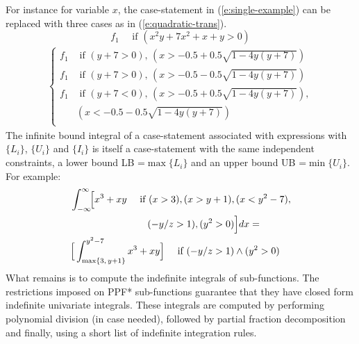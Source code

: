 \documentclass{article}
\newcommand{\case}[2]{#2 &\text{ if } #1}%
\newcommand{\singlecase}[2]{#2 \quad \text{ if } #1}
\begin{document}
For instance for variable $x$, the case-statement in (\ref{e:single-example})
can be replaced with three cases as in (\ref{e:quadratic-trans}).
{
\footnotesize
\begin{equation}
\label{e:single-example}
\singlecase{(x^2 y + 7x^2 + x + y > 0)}{f_1}
\end{equation}
\begin{align}
\label{e:quadratic-trans}
{
\begin{cases}
  \case{(y+7>0), \, (x> -0.5 + 0.5\sqrt{1 - 4y(y+7)}) }{f_1} \\ 
  \case{(y+7>0), \, (x> -0.5 - 0.5\sqrt{1 - 4y(y+7)}) }{f_1} \\ 
  \case{(y+7<0), \, (x > -0.5 + 0.5\sqrt{1 - 4y(y+7)}),\\
& (x < -0.5 - 0.5\sqrt{1 - 4y(y+7)}) }{f_1} \\ 
 \end{cases}
}
\end{align}
}
The infinite bound integral of a case-statement 
associated with expressions with $\{L_i\}$, $\{U_i\}$ and $\{I_i\}$ 
is itself a case-statement with the same independent constraints,
a lower bound LB =$\max\{L_i\}$ and 
an upper bound UB =$ \min\{U_i\}$.
For example:
{\footnotesize 
\begin{align*}
&\int_{-\infty}^{\infty}\!\! \Big[
\singlecase{(x>3), (x>y+1), (x<y^2-7), \\
&\hspace{28mm} (-y/z > 1) , (y^2>0)}
{x^3 + xy} \Big] dx = \\
&\singlecase{(-y/z > 1) \wedge (y^2>0)}
{\Big[ \int_{\max\{3, \, y+1\}}^{y^2 - 7}x^3 + xy \Big]} 
\end{align*}  
}
What remains is to compute the indefinite integrals of sub-functions. 
The restrictions imposed on PPF* sub-functions 
guarantee that they have closed form indefinite univariate integrals.
These integrals are computed by performing polynomial division (in case needed),
followed by partial fraction decomposition and finally, using a short list of indefinite integration rules.

\end{document}
